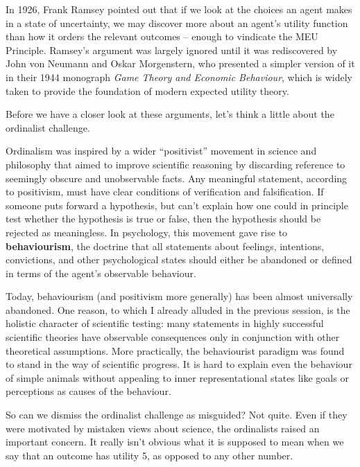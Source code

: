 In 1926, Frank Ramsey pointed out that if we look at the choices an
agent makes in a state of uncertainty, we may discover more about an
agent's utility function than how it orders the relevant outcomes --
enough to vindicate the MEU Principle. Ramsey's argument was largely
ignored until it was rediscovered by John von Neumann and Oskar
Morgenstern, who presented a simpler version of it in their 1944
monograph \emph{Game Theory and Economic Behaviour}, which is widely
taken to provide the foundation of modern expected utility theory.

Before we have a closer look at these arguments, let's think a
little about the ordinalist challenge.

Ordinalism was inspired by a wider ``positivist'' movement in science
and philosophy that aimed to improve scientific reasoning by
discarding reference to seemingly obscure and unobservable facts. Any
meaningful statement, according to positivism, must have clear
conditions of verification and falsification. If someone puts
forward a hypothesis, but can't explain how one could in principle
test whether the hypothesis is true or false, then the hypothesis
should be rejected as meaningless.  In psychology, this movement gave
rise to \textbf{behaviourism}, the doctrine that all statements about
feelings, intentions, convictions, and other psychological states
should either be abandoned or defined in terms of the agent's
observable behaviour.

Today, behaviourism (and positivism more generally) has been almost
universally abandoned.  One reason, to which I already alluded in the
previous session, is the holistic character of scientific testing:
many statements in highly successful scientific theories have
observable consequences only in conjunction with other theoretical
assumptions.%
%
More practically, the behaviourist paradigm was found to stand in the
way of scientific progress. It is hard to explain even the behaviour
of simple animals without appealing to inner representational states
like goals or perceptions as causes of the behaviour.

So can we dismiss the ordinalist challenge as misguided? Not
quite. Even if they were motivated by mistaken views about science,
the ordinalists raised an important concern. It really isn't obvious
what it is supposed to mean when we say that an outcome has utility 5,
as opposed to any other number.

